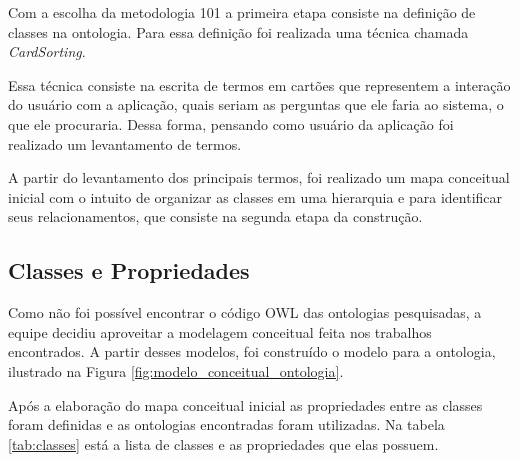       Com a escolha da metodologia 101 a primeira etapa consiste na definição de classes na ontologia.
      Para essa definição foi realizada uma técnica chamada \textit{CardSorting}. 
      
      Essa técnica consiste na escrita de termos em cartões que representem a interação do usuário com a aplicação,
      quais seriam as perguntas que ele faria ao sistema, o que ele procuraria. Dessa forma, pensando como usuário
      da aplicação foi realizado um levantamento de termos.

      A partir do levantamento dos principais termos, foi realizado um mapa conceitual inicial com o intuito
      de organizar as classes em uma hierarquia e para identificar seus relacionamentos, que consiste na segunda
      etapa da construção.

      \subsection{Classes e Propriedades}
      
	  Como não foi possível encontrar o código OWL das ontologias pesquisadas, a equipe decidiu aproveitar a
	  modelagem conceitual feita nos trabalhos encontrados. A partir desses modelos, foi construído o modelo 
	  para a ontologia, ilustrado na Figura \ref{fig:modelo_conceitual_ontologia}.
	  
	  Após a elaboração do mapa conceitual inicial as propriedades entre as classes foram definidas e as ontologias
	  encontradas foram utilizadas. 
	  Na tabela \ref{tab:classes} está a lista de classes e as propriedades que elas possuem.      

